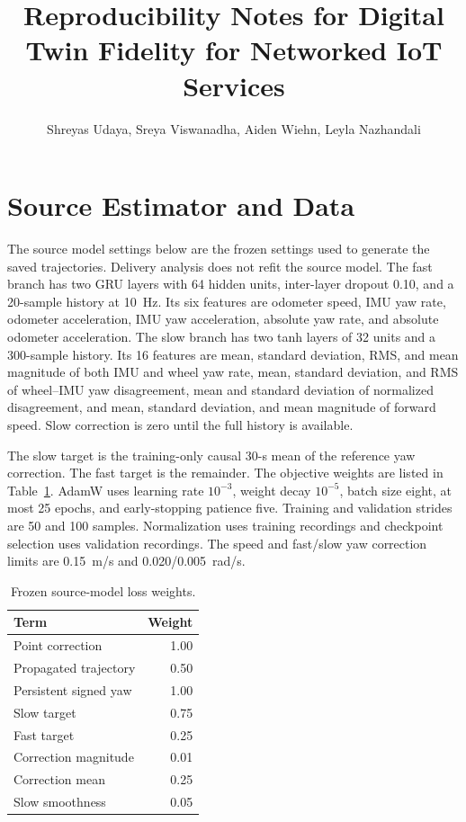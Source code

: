 \documentclass[journal]{IEEEtran}
\title{Reproducibility Notes for Digital Twin Fidelity for Networked IoT Services}
\author{Shreyas Udaya, Sreya Viswanadha, Aiden Wiehn, Leyla Nazhandali}
\begin{document}
\maketitle

\section{Source Estimator and Data}
The source model settings below are the frozen settings used to generate
the saved trajectories. Delivery analysis does not refit the source model.
The fast branch has two GRU layers with 64 hidden units, inter-layer
dropout 0.10, and a 20-sample history at 10~Hz. Its six features are
odometer speed, IMU yaw rate, odometer acceleration, IMU yaw acceleration,
absolute yaw rate, and absolute odometer acceleration. The slow branch
has two tanh layers of 32 units and a 300-sample history. Its 16 features
are mean, standard deviation, RMS, and mean magnitude of both IMU and
wheel yaw rate, mean, standard deviation, and RMS of wheel--IMU yaw
disagreement, mean and standard deviation of normalized disagreement,
and mean, standard deviation, and mean magnitude of forward speed.
Slow correction is zero until the full history is available.

The slow target is the training-only causal 30-s mean of the reference
yaw correction. The fast target is the remainder. The objective weights
are listed in Table~\ref{tab:losses}. AdamW uses learning rate $10^{-3}$,
weight decay $10^{-5}$, batch size eight, at most 25 epochs, and
early-stopping patience five. Training and validation strides are 50
and 100 samples. Normalization uses training recordings and checkpoint
selection uses validation recordings. The speed and fast/slow yaw
correction limits are 0.15~m/s and 0.020/0.005~rad/s.

\begin{table}[t]
\centering
\caption{Frozen source-model loss weights.}
\label{tab:losses}
\begin{tabular}{lr}
\toprule
Term & Weight\\
\midrule
Point correction & 1.00\\
Propagated trajectory & 0.50\\
Persistent signed yaw & 1.00\\
Slow target & 0.75\\
Fast target & 0.25\\
Correction magnitude & 0.01\\
Correction mean & 0.25\\
Slow smoothness & 0.05\\
\bottomrule
\end{tabular}
\end{table}
\end{document}
